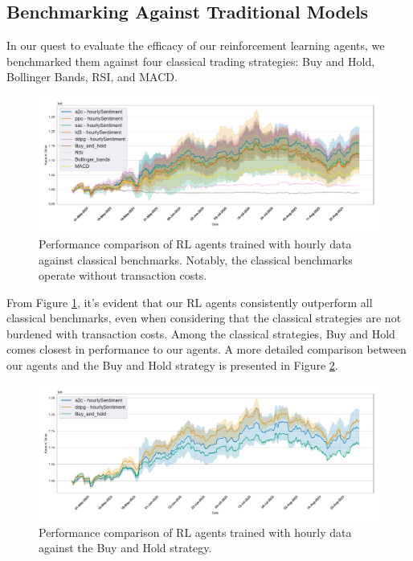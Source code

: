 \documentclass[12pt]{article}
\begin{document}
\subsection{Benchmarking Against Traditional Models}

In our quest to evaluate the efficacy of our reinforcement learning agents, we benchmarked them against four classical trading strategies: Buy and Hold, Bollinger Bands, RSI, and MACD. 

\begin{figure}[h]
    \centering
    \includegraphics[width=1\textwidth]{figs/Models_comparison/Compare_agent_performance_hourlySentimentTechnical_a2c_ppo_sac_td3_ddpg_technical.pdf}
    \caption{Performance comparison of RL agents trained with hourly data against classical benchmarks. Notably, the classical benchmarks operate without transaction costs.}
\label{fig:Compare_agent_performance_hourlySentimentTechnical_a2c_ppo_sac_td3_ddpg_technical}
\end{figure}

From Figure \ref{fig:Compare_agent_performance_hourlySentimentTechnical_a2c_ppo_sac_td3_ddpg_technical}, it's evident that our RL agents consistently outperform all classical benchmarks, even when considering that the classical strategies are not burdened with transaction costs. Among the classical strategies, Buy and Hold comes closest in performance to our agents. A more detailed comparison between our agents and the Buy and Hold strategy is presented in Figure \ref{fig:Compare_agent_performance_hourlySentimentTechnical_a2c_ddpg_buy_hold}.

\begin{figure}[h]
    \centering
    \includegraphics[width=1\textwidth]{figs/Models_comparison/Compare_agent_performance_hourlySentimentTechnical_a2c_ddpg_buy_hold.pdf}
    \caption{Performance comparison of RL agents trained with hourly data against the Buy and Hold strategy.}
\label{fig:Compare_agent_performance_hourlySentimentTechnical_a2c_ddpg_buy_hold}
\end{figure}
\end{document}
